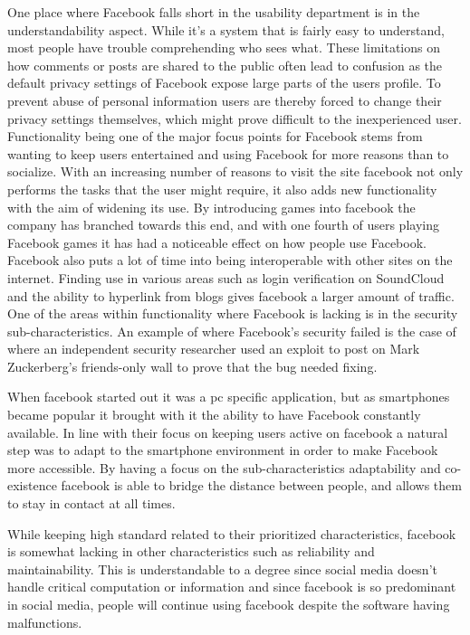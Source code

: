 \documentclass[conference]{IEEEtran}
\begin{document}
One place where Facebook falls short in the usability department is in the understandability aspect. While it’s a system that is fairly easy to understand, most people have trouble comprehending who sees what. These limitations on how comments or posts are shared to the public often lead to confusion as the default privacy settings of Facebook expose large parts of the users profile\cite{paul2011}. To prevent abuse of personal information users are thereby forced to change their privacy settings themselves, which might prove difficult to the inexperienced user.             
Functionality being one of the major focus points for Facebook stems from wanting to keep users entertained and using Facebook for more reasons than to socialize. With an increasing number of reasons to visit the site facebook not only performs the tasks that the user might require, it also adds new functionality with the aim of widening its use. By introducing games into facebook the company has branched towards this end, and with one fourth of users playing Facebook games it has had a noticeable effect on how people use Facebook\cite{constine2012}. Facebook also puts a lot of time into being interoperable with other sites on the internet. Finding use in various areas such as login verification on SoundCloud and the ability to hyperlink from blogs gives facebook a larger amount of  traffic. One of the areas within functionality where Facebook is lacking is in the security sub-characteristics. An example of where Facebook’s security failed is the case of where an independent security researcher used an exploit to post on Mark Zuckerberg’s friends-only wall to prove that the bug needed fixing\cite{kumparak2013}.          
 
 When facebook started out it was a pc specific application, but as smartphones became popular it brought with it the ability to have Facebook constantly available. In line with their focus on keeping users active on facebook a natural step was to adapt to the smartphone environment in order to make Facebook more accessible. By having a focus on the sub-characteristics adaptability and co-existence facebook is able to bridge the distance between people, and allows them to stay in contact at all times. 
 
 While keeping high standard related to their prioritized characteristics, facebook is somewhat lacking in other characteristics such as reliability and maintainability. 
This is understandable to a degree since social media doesn’t handle critical computation or information and since facebook is so predominant in social media, people will continue using facebook despite the software having malfunctions. 
\end{document}
